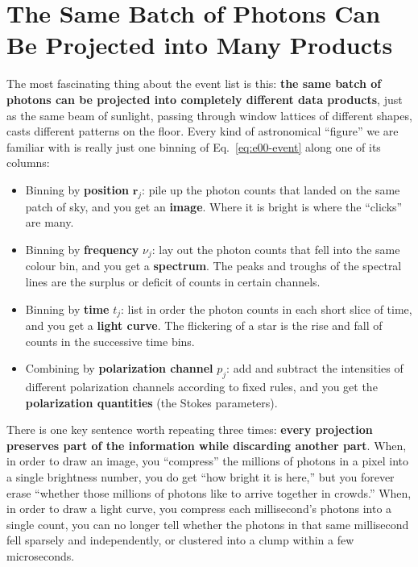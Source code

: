 \section{The Same Batch of Photons Can Be Projected into Many Products}
\label{sec:e00-projection}

The most fascinating thing about the event list is this: \textbf{the same batch of photons can be projected into completely different data products}, just as the same beam of sunlight, passing through window lattices of different shapes, casts different patterns on the floor. Every kind of astronomical ``figure'' we are familiar with is really just one binning of Eq.~\eqref{eq:e00-event} along one of its columns:

\begin{itemize}
  \item Binning by \textbf{position} \(\bm r_j\): pile up the photon counts that landed on the same patch of sky, and you get an \textbf{image}. Where it is bright is where the ``clicks'' are many.
  \item Binning by \textbf{frequency} \(\nu_j\): lay out the photon counts that fell into the same colour bin, and you get a \textbf{spectrum}. The peaks and troughs of the spectral lines are the surplus or deficit of counts in certain channels.
  \item Binning by \textbf{time} \(t_j\): list in order the photon counts in each short slice of time, and you get a \textbf{light curve}. The flickering of a star is the rise and fall of counts in the successive time bins.
  \item Combining by \textbf{polarization channel} \(p_j\): add and subtract the intensities of different polarization channels according to fixed rules, and you get the \textbf{polarization quantities} (the Stokes parameters).
\end{itemize}

There is one key sentence worth repeating three times: \textbf{every projection preserves part of the information while discarding another part}. When, in order to draw an image, you ``compress'' the millions of photons in a pixel into a single brightness number, you do get ``how bright it is here,'' but you forever erase ``whether those millions of photons like to arrive together in crowds.'' When, in order to draw a light curve, you compress each millisecond's photons into a single count, you can no longer tell whether the photons in that same millisecond fell sparsely and independently, or clustered into a clump within a few microseconds.

